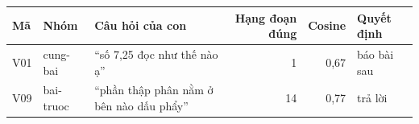 \small
\begin{tabularx}{\linewidth}{@{}llYrrl@{}}
\toprule
Mã & Nhóm & Câu hỏi của con & Hạng đoạn đúng & Cosine & Quyết định \\
\midrule
V01 & cung-bai & ``số 7,25 đọc như thế nào ạ'' & 1 & 0,67 & báo bài sau \\
V09 & bai-truoc & ``phần thập phân nằm ở bên nào dấu phẩy'' & 14 & 0,77 & trả lời \\
\bottomrule
\end{tabularx}
